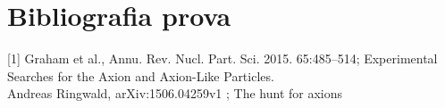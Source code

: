 
\section*{Bibliografia prova}


[1] Graham et al., Annu. Rev. Nucl. Part. Sci. 2015. 65:485–514; Experimental Searches for the Axion and Axion-Like Particles.\\

\noindent
[2] Andreas Ringwald, arXiv:1506.04259v1  ; The hunt for axions



